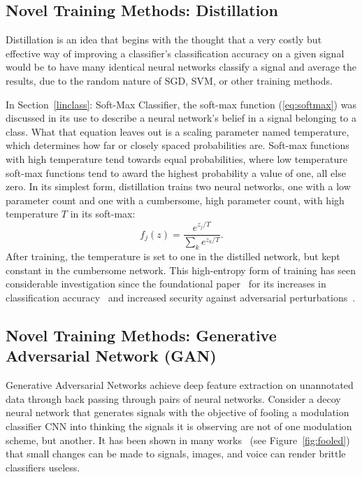 \subsection{Novel Training Methods: Distillation}
\label{distill}
Distillation is an idea\cite{distill} that begins with the thought that a very costly but effective way of improving a classifier's classification accuracy on a given signal would be to have many identical neural networks classify a signal and average the results, due to the random nature of SGD, SVM, or other training methods.

In Section~\ref{linclass}: Soft-Max Classifier, the soft-max function (\ref{eq:softmax}) was discussed in its use to describe a neural network's belief in a signal belonging to a class. What that equation leaves out is a scaling parameter named temperature, which determines how far or closely spaced probabilities are. Soft-max functions with high temperature tend towards equal probabilities, where low temperature soft-max functions tend to award the highest probability a value of one, all else zero. In its simplest form, distillation trains two neural networks, one with a low parameter count and one with a cumbersome, high parameter count, with high temperature $T$ in its soft-max:
\begin{equation}
\label{eq:tempsoftmax}
f_j(z) = \frac{e^{z_j/T}}{\sum_k e^{z_k/T}}.
\end{equation}
After training, the temperature is set to one in the distilled network, but kept constant in the cumbersome network. This high-entropy form of training has seen considerable investigation since the foundational paper~\cite{distill} for its increases in classification accuracy~\cite{distill} and increased security against adversarial perturbations~\cite{distdefense}.

\subsection{Novel Training Methods: Generative Adversarial Network (GAN)}
\label{gan}
Generative Adversarial Networks\cite{gan} achieve deep feature extraction on unannotated data through back passing through pairs of neural networks. Consider a decoy neural network that generates signals with the objective of fooling a modulation classifier CNN into thinking the signals it is observing are not of one modulation scheme, but another. It has been shown in many works~\cite{fooled} (see Figure~\ref{fig:fooled}) that small changes can be made to signals, images, and voice can render brittle classifiers useless.

